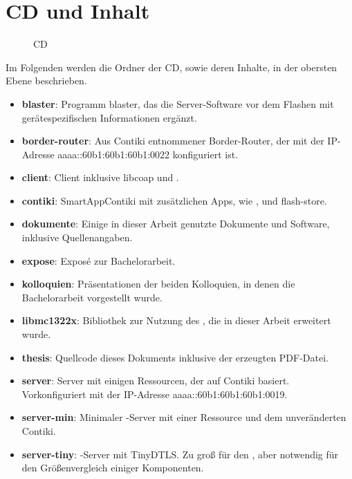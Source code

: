 \chapter{CD und Inhalt}

\begin{figure}[!ht]
\centering
{}
\caption{CD}
\label{tbl:a-cd}
\end{figure}

\clearpage

Im Folgenden werden die Ordner der CD, sowie deren Inhalte, in der obersten Ebene beschrieben. \newline

\begin{itemize}
  \setlength{\itemsep}{0.5cm}
  \item \textbf{blaster}: Programm blaster, das die Server-Software vor dem Flashen mit \newline gerätespezifischen Informationen ergänzt.
  \item \textbf{border-router}: Aus Contiki entnommener Border-Router, der mit der \newline IP-Adresse aaaa::60b1:60b1:60b1:0022 konfiguriert ist.
  \item \textbf{client}: Client inklusive libcoap und .
  \item \textbf{contiki}: SmartAppContiki mit zusätzlichen Apps, wie ,  und flash-store.
  \item \textbf{dokumente}: Einige in dieser Arbeit genutzte Dokumente und Software, inklusive Quellenangaben.
  \item \textbf{expose}: Exposé zur Bachelorarbeit.
  \item \textbf{kolloquien}: Präsentationen der beiden Kolloquien, in denen die Bachelorarbeit vorgestellt wurde.
  \item \textbf{libmc1322x}: Bibliothek zur Nutzung des , die in dieser Arbeit erweitert wurde.
  \item \textbf{thesis}: Quellcode dieses Dokuments inklusive der erzeugten PDF-Datei.
  \item \textbf{server}: Server mit einigen Ressourcen, der auf Contiki basiert. \newline Vorkonfiguriert mit der IP-Adresse aaaa::60b1:60b1:60b1:0019.
  \item \textbf{server-min}: Minimaler -Server mit einer Ressource und dem unveränderten Contiki.
  \item \textbf{server-tiny}: -Server mit TinyDTLS. Zu groß für den , \newline aber notwendig für den Größenvergleich einiger Komponenten.

\end{itemize}
